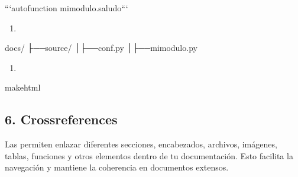 \documentclass[a4paper,10pt,spanish]{sphinxmanual}
\begin{document}
\begin{sphinxVerbatim}[commandchars=\\\{\}]


```\PYGZob{}autofunction\PYGZcb{} mi\PYGZus{}modulo.saludo```
\end{sphinxVerbatim}
\begin{enumerate}
%
\setcounter{enumi}{2}
\item {} 
\sphinxAtStartPar
{}

\end{enumerate}

\begin{sphinxVerbatim}[commandchars=\\\{\}]
docs/
├──source/
│├──conf.py
│├──mi\PYGZus{}modulo.py
\end{sphinxVerbatim}

\sphinxAtStartPar
{}

\begin{sphinxVerbatim}[commandchars=\\\{\}]
 
\end{sphinxVerbatim}
\begin{enumerate}
%
\setcounter{enumi}{3}
\item {} 
\sphinxAtStartPar
{}

\end{enumerate}

\begin{sphinxVerbatim}[commandchars=\\\{\}]
makehtml
\end{sphinxVerbatim}


\subsection{6. Cross\sphinxhyphen{}references}
\label{\detokenize{configuracion_inicial/013.guia_de_myst_parser:cross-references}}
\sphinxAtStartPar
Las  permiten enlazar diferentes secciones, encabezados, archivos, imágenes, tablas, funciones y otros elementos dentro de tu documentación. Esto facilita la navegación y mantiene la coherencia en documentos extensos.
\end{document}
